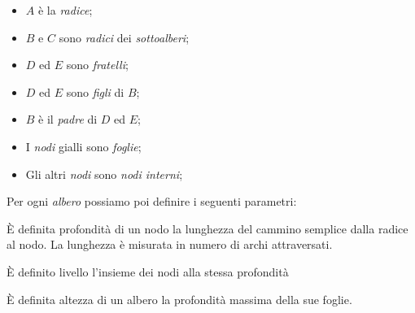 \medskip\noindent\begin{minipage}[t]{0.48\textwidth}
    \begin{itemize}
        \item $A$ è la \emph{radice};
        \item $B$ e $C$ sono \emph{radici} dei \emph{sottoalberi};
        \item $D$ ed $E$ sono \emph{fratelli};
        \item $D$ ed $E$ sono \emph{figli} di $B$;
    \end{itemize}
\end{minipage}
\hfill
\begin{minipage}[t]{0.48\textwidth}
    \begin{itemize}
        \item $B$ è il \emph{padre} di $D$ ed $E$;
        \item I \emph{nodi} gialli sono \emph{foglie};
        \item Gli altri \emph{nodi} sono \emph{nodi interni};
    \end{itemize}
\end{minipage}

\bigskip\noindent
Per ogni \emph{albero} possiamo poi definire i seguenti parametri:
\begin{definition}
    È definita profondità di un nodo la lunghezza del cammino semplice dalla
    radice al nodo. La lunghezza è misurata in numero di archi attraversati.
\end{definition}
\begin{definition}
    È definito livello l'insieme dei nodi alla stessa profondità
\end{definition}
\begin{definition}
    È definita altezza di un albero la profondità massima della sue foglie.
\end{definition}

